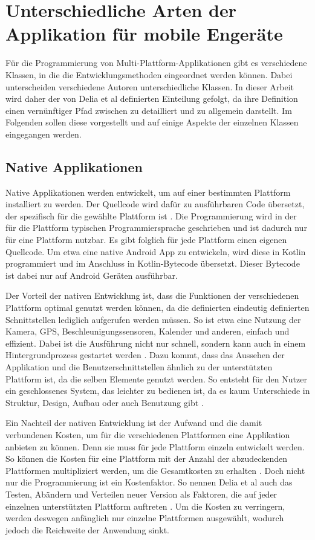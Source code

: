 \section{Unterschiedliche Arten der Applikation für mobile Engeräte}
Für die Programmierung von Multi-Plattform-Applikationen gibt es verschiedene Klassen, in die die Entwicklungsmethoden eingeordnet werden können. Dabei unterscheiden verschiedene Autoren unterschiedliche Klassen. In dieser Arbeit wird daher der von Delia et al \cite{IEEE_development_classes} definierten Einteilung gefolgt, da ihre Definition einen vernünftiger Pfad zwischen zu detailliert und zu allgemein darstellt. Im Folgenden sollen diese vorgestellt und auf einige Aspekte der einzelnen Klassen eingegangen werden.

\subsection{Native Applikationen}
Native Applikationen werden entwickelt, um auf einer bestimmten Plattform installiert zu werden. Der Quellcode wird dafür zu ausführbaren Code übersetzt, der spezifisch für die gewählte Plattform ist \cite{IEEE_development_classes}.
Die Programmierung wird in der für die Plattform typischen Programmiersprache geschrieben und ist dadurch nur für eine Plattform nutzbar. Es gibt folglich für jede Plattform einen eigenen Quellcode. Um etwa eine native Android App zu entwickeln, wird diese in Kotlin programmiert und im Anschluss in Kotlin-Bytecode übersetzt. Dieser Bytecode ist dabei nur auf Android Geräten ausführbar.

Der Vorteil der nativen Entwicklung ist, dass die Funktionen der verschiedenen Plattform optimal genutzt werden können, da die definierten eindeutig definierten Schnittstellen lediglich aufgerufen werden müssen. So ist etwa eine Nutzung der Kamera, GPS, Beschleunigungssensoren, Kalender und anderen, einfach und effizient. Dabei ist die Ausführung nicht nur schnell, sondern kann auch in einem Hintergrundprozess gestartet werden \cite{IEEE_development_classes}. Dazu kommt, dass das Aussehen der Applikation und die Benutzerschnittstellen ähnlich zu der unterstützten Plattform ist, da die selben Elemente genutzt werden. So entsteht für den Nutzer ein geschlossenes System, das leichter zu bedienen ist, da es kaum Unterschiede in Struktur, Design, Aufbau oder auch Benutzung gibt \cite{IEEE_Khackouch_Al}.

Ein Nachteil der nativen Entwicklung ist der Aufwand und die damit verbundenen Kosten, um für die verschiedenen Plattformen eine Applikation anbieten zu können. Denn sie muss für jede Plattform einzeln entwickelt werden. So können die Kosten für eine Plattform mit der Anzahl der abzudeckenden Plattformen multipliziert werden, um die Gesamtkosten zu erhalten \cite{IEEE_Khackouch_Al}. Doch nicht nur die Programmierung ist ein Kostenfaktor. So nennen Delia et al auch das Testen, Abändern und Verteilen neuer Version als Faktoren, die auf jeder einzelnen unterstützten Plattform auftreten \cite{IEEE_development_classes}. Um die Kosten zu verringern, werden deswegen anfänglich nur einzelne Plattformen ausgewählt, wodurch jedoch die Reichweite der Anwendung sinkt.


